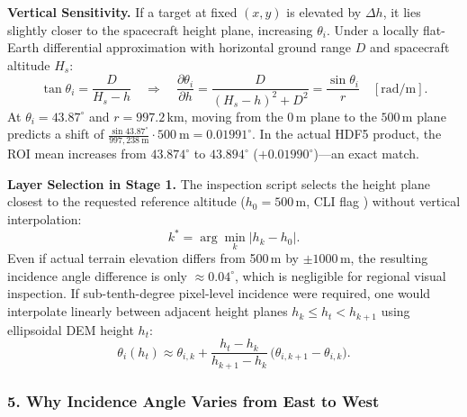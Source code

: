 \documentclass[11pt,a4paper]{article}
\begin{document}
\textbf{Vertical Sensitivity.} If a target at fixed $(x,y)$ is elevated by $\Delta h$, it lies slightly closer to the spacecraft height plane, increasing $\theta_i$. Under a locally flat-Earth differential approximation with horizontal ground range $D$ and spacecraft altitude $H_s$:
\begin{equation}
  \tan\theta_i = \frac{D}{H_s - h}
  \quad\Longrightarrow\quad
  \frac{\partial\theta_i}{\partial h} = \frac{D}{(H_s-h)^2 + D^2} = \frac{\sin\theta_i}{r}\quad[\text{rad/m}].
\end{equation}
At $\theta_i = 43.87^\circ$ and $r = 997.2$\,km, moving from the $0$\,m plane to the $500$\,m plane predicts a shift of
$\frac{\sin 43.87^\circ}{997,238\ \text{m}}\cdot 500\ \text{m} = 0.01991^\circ$. In the actual HDF5 product, the ROI mean increases from $43.874^\circ$ to $43.894^\circ$ ($+0.01990^\circ$)---an exact match.

\textbf{Layer Selection in Stage 1.} The inspection script selects the height plane closest to the requested reference altitude ($h_0 = 500$\,m, CLI flag ) without vertical interpolation:
\begin{equation}
  k^\ast = \arg\min_k \lvert h_k - h_0 \rvert .
\end{equation}
Even if actual terrain elevation differs from 500\,m by $\pm 1000$\,m, the resulting incidence angle difference is only $\approx 0.04^\circ$, which is negligible for regional visual inspection. If sub-tenth-degree pixel-level incidence were required, one would interpolate linearly between adjacent height planes $h_k \le h_t < h_{k+1}$ using ellipsoidal DEM height $h_t$:
\begin{equation}
  \theta_i(h_t) \approx \theta_{i,k} + \frac{h_t - h_k}{h_{k+1} - h_k}\,\bigl(\theta_{i,k+1} - \theta_{i,k}\bigr).
\end{equation}

\subsubsection*{5. Why Incidence Angle Varies from East to West}
\end{document}
